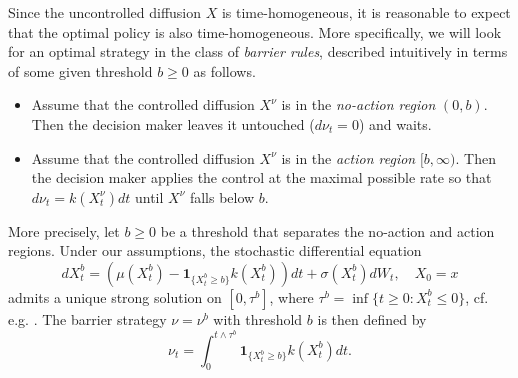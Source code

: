 \documentclass[12pt]{article}
\begin{document}
Since the uncontrolled diffusion $X$ is time-homogeneous, it is reasonable to expect that the optimal policy is also time-homogeneous. 
More specifically, we will look for an optimal strategy in the class of {\em barrier rules}, described intuitively in terms of some given threshold $b\geq 0$ as follows. 
\begin{itemize}
    \item[(A)] Assume that the controlled diffusion $X^\nu$ is in the \emph{no-action region} $(0,b)$. Then the decision maker leaves it untouched ($d\nu_t = 0$) and waits.
    \item[(B)] Assume that the controlled diffusion $X^\nu$ is in the \emph{action region} $[b, \infty)$. Then the decision maker applies the control at the maximal possible rate so that $d\nu_t = k(X^\nu_t) dt$ until $X^\nu$ falls below $b$.
\end{itemize}
More precisely, let $b\geq 0$ be a threshold that separates the no-action and action regions. Under our assumptions, the stochastic differential equation 
\begin{equation} \label{Eq:ControlledBarrierDiffusion}
    dX^b_{t} = (\mu(X^b_{t}) - \mathbf{1}_{\{X^b_{t} \geq b\}} k(X^b_{t}) )dt + \sigma(X^b_{t}) dW_{t}, \quad X_0 = x
\end{equation}
admits a unique strong solution on $[0,\tau^b]$, where 
$\tau^b=\inf\{t\geq 0:X^b_t\leq 0\}$,
cf. e.g. \cite[Proposition 5.5.17]{KaratzasShreve1991}. The barrier strategy $\nu=\nu^b$ with threshold $b$ is then defined by
\[    \nu_t=\int_0^{t\wedge\tau^b}\mathbf{1}_{\{X^b_t \geq b\}} k(X^b_t) dt.\]
\end{document}
